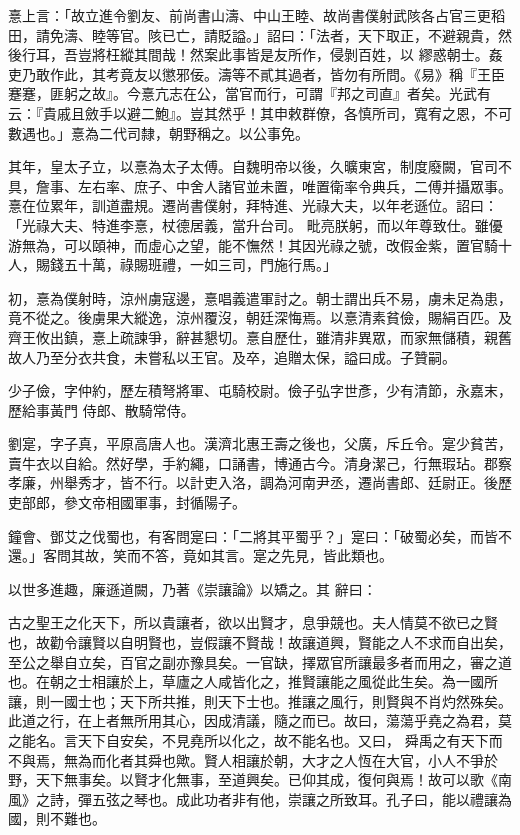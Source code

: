 \begin{pinyinscope}
 憙上言：「故立進令劉友、前尚書山濤、中山王睦、故尚書僕射武陔各占官三更稻田，請免濤、睦等官。陔已亡，請貶謚。」詔曰：「法者，天下取正，不避親貴，然後行耳，吾豈將枉縱其間哉！然案此事皆是友所作，侵剝百姓，以
 繆惑朝士。姦吏乃敢作此，其考竟友以懲邪佞。濤等不貳其過者，皆勿有所問。《易》稱『王臣蹇蹇，匪躬之故』。今憙亢志在公，當官而行，可謂『邦之司直』者矣。光武有云：『貴戚且斂手以避二鮑』。豈其然乎！其申敕群僚，各慎所司，寬宥之恩，不可數遇也。」憙為二代司隸，朝野稱之。以公事免。



 其年，皇太子立，以憙為太子太傅。自魏明帝以後，久曠東宮，制度廢闕，官司不具，詹事、左右率、庶子、中舍人諸官並未置，唯置衛率令典兵，二傅并攝眾事。憙在位累年，訓道盡規。遷尚書僕射，拜特進、光祿大夫，以年老遜位。詔曰：「光祿大夫、特進李憙，杖德居義，當升台司。
 毗亮朕躬，而以年尊致仕。雖優游無為，可以頤神，而虛心之望，能不憮然！其因光祿之號，改假金紫，置官騎十人，賜錢五十萬，祿賜班禮，一如三司，門施行馬。」



 初，憙為僕射時，涼州虜寇邊，憙唱義遣軍討之。朝士謂出兵不易，虜未足為患，竟不從之。後虜果大縱逸，涼州覆沒，朝廷深悔焉。以憙清素貧儉，賜絹百匹。及齊王攸出鎮，憙上疏諫爭，辭甚懇切。憙自歷仕，雖清非異眾，而家無儲積，親舊故人乃至分衣共食，未嘗私以王官。及卒，追贈太保，謚曰成。子贊嗣。



 少子儉，字仲約，歷左積弩將軍、屯騎校尉。儉子弘字世彥，少有清節，永嘉末，歷給事黃門
 侍郎、散騎常侍。



 劉寔，字子真，平原高唐人也。漢濟北惠王壽之後也，父廣，斥丘令。寔少貧苦，賣牛衣以自給。然好學，手約繩，口誦書，博通古今。清身潔己，行無瑕玷。郡察孝廉，州舉秀才，皆不行。以計吏入洛，調為河南尹丞，遷尚書郎、廷尉正。後歷吏部郎，參文帝相國軍事，封循陽子。



 鐘會、鄧艾之伐蜀也，有客問寔曰：「二將其平蜀乎？」寔曰：「破蜀必矣，而皆不還。」客問其故，笑而不答，竟如其言。寔之先見，皆此類也。



 以世多進趣，廉遜道闕，乃著《崇讓論》以矯之。其
 辭曰：



 古之聖王之化天下，所以貴讓者，欲以出賢才，息爭競也。夫人情莫不欲已之賢也，故勸令讓賢以自明賢也，豈假讓不賢哉！故讓道興，賢能之人不求而自出矣，至公之舉自立矣，百官之副亦豫具矣。一官缺，擇眾官所讓最多者而用之，審之道也。在朝之士相讓於上，草廬之人咸皆化之，推賢讓能之風從此生矣。為一國所讓，則一國士也；天下所共推，則天下士也。推讓之風行，則賢與不肖灼然殊矣。此道之行，在上者無所用其心，因成清議，隨之而已。故曰，蕩蕩乎堯之為君，莫之能名。言天下自安矣，不見堯所以化之，故不能名也。又曰，
 舜禹之有天下而不與焉，無為而化者其舜也歟。賢人相讓於朝，大才之人恆在大官，小人不爭於野，天下無事矣。以賢才化無事，至道興矣。已仰其成，復何與焉！故可以歌《南風》之詩，彈五弦之琴也。成此功者非有他，崇讓之所致耳。孔子曰，能以禮讓為國，則不難也。




\end{pinyinscope}
